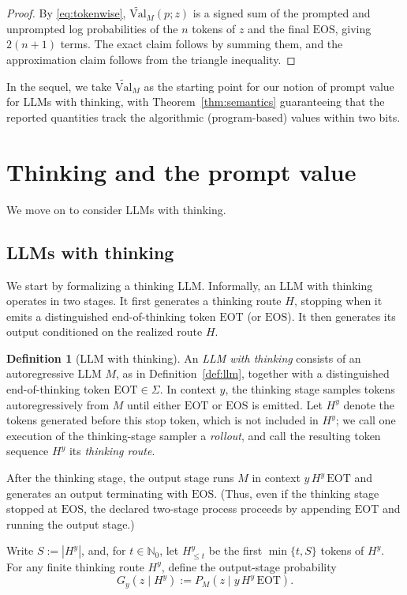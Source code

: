 \documentclass[letterpaper]{article} %
\theoremstyle{definition}
\newtheorem{definition}[theorem]{Definition}
\theoremstyle{remark}
\newcommand{\EOT}{\mathrm{EOT}}
\newcommand{\Val}{\mathrm{Val}}
\newcommand{\EOS}{\mathrm{EOS}}
\begin{document}
\begin{proof}
By \eqref{eq:tokenwise}, \(\widetilde{\Val}_M(p;z)\) is a signed sum of the
prompted and unprompted log probabilities of the \(n\) tokens of \(z\) and the
final \(\EOS\), giving \(2(n+1)\) terms.  The exact claim follows by summing
them, and the approximation claim follows from the triangle inequality.
\end{proof}

In the sequel, we take  $\widetilde{\Val}_M$ as the starting point for our notion of prompt value for LLMs with thinking,
with Theorem~\ref{thm:semantics} guaranteeing that the reported quantities
track the algorithmic (program-based) values within two bits.

\section{Thinking and the prompt value}\label{sec:thinking}

We move on to consider LLMs with thinking.

\subsection{LLMs with thinking}\label{sec:process}
We start by formalizing a thinking LLM. Informally, an LLM with thinking operates in two stages. It first generates a
thinking route \(H\), stopping when it emits a distinguished
end-of-thinking token \(\EOT\) (or \(\EOS\)). It then generates its output
conditioned on the realized route \(H\).

\begin{definition}[LLM with thinking]\label{def:thinking}
An \emph{LLM with thinking} consists of an autoregressive LLM \(M\), as in
Definition~\ref{def:llm}, together with a distinguished end-of-thinking token
\(\EOT\in\Sigma\). In context \(y\), the thinking stage samples tokens
autoregressively from \(M\) until either \(\EOT\) or \(\EOS\) is emitted. Let
\(H^y\) denote the tokens generated before this stop token, which is not
included in \(H^y\); we call one execution of the thinking-stage sampler a \emph{rollout}, and call
the resulting token sequence \(H^y\) its \emph{thinking route}.

After the thinking stage, the output stage runs \(M\) in context
\(y\,H^y\,\EOT\) and generates an output terminating with \(\EOS\). (Thus, even
if the thinking stage stopped at \(\EOS\), the declared two-stage process
proceeds by appending \(\EOT\) and running the output stage.)

Write \(S:=|H^y|\), and, for \(t\in\mathbb N_0\), let \(H^y_{\leq t}\) be the
first \(\min\{t,S\}\) tokens of \(H^y\). For any finite thinking route \(H^y\),
define the output-stage probability
\[
G_y(z\mid H^y):=P_M(z\mid y\,H^y\,\EOT).
\]
\end{definition}
\end{document}
